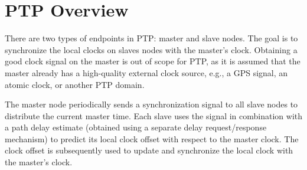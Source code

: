 \section{PTP Overview}
\label{sec:ptp-overview}
There are two types of endpoints in PTP: master and slave nodes.
The goal is to synchronize the local clocks on slaves nodes with the master's
clock.
Obtaining a good clock signal on the master is out of scope for PTP,
as it is assumed that the master already has a high-quality external clock source,
e.g., a GPS signal, an atomic clock, or another PTP domain.

The master node periodically sends a synchronization signal to all slave nodes
to distribute the current master time.
Each slave uses the signal in combination with a path delay estimate
(obtained using a separate delay request/response mechanism)
to predict its local clock offset with respect to the master clock.
The clock offset is subsequently used to update and synchronize the local clock
with the master's clock.


